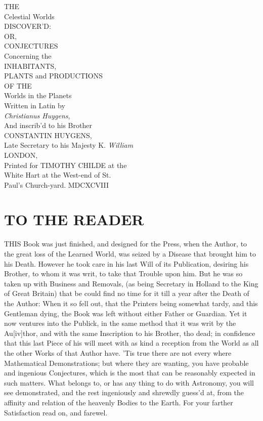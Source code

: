 \documentclass[letterpaper]{book}
\begin{document}
\frontmatter

\thispagestyle{empty}

\begin{titlepage}
	\begin{center}
		\Huge
THE \\
Celestial Worlds \\
DISCOVER'D: \\
OR, \\
CONJECTURES \\
Concerning the \\
INHABITANTS, \\
PLANTS and PRODUCTIONS \\
OF THE \\
Worlds in the Planets \\
\phantom{bla bla}
\phantom{bla bla}
\Large
Written in Latin by \\
\emph{Christianus Huygens}, \\
And inscrib'd to his Brother \\
CONSTANTIN HUYGENS, \\
Late Secretary to his Majesty K. \emph{William} \\
\phantom{bla bla}
\phantom{bla bla}
LONDON, \\
Printed for TIMOTHY CHILDE at the \\
White Hart at the West-end of St. \\
Paul's Church-yard. MDCXCVIII
\end{center}
\end{titlepage}


\chapter{TO THE READER} %
\label{sec:TO THE READER}

THIS Book was just finished, and designed for the Press, when the Author,
to the great loss of the Learned World, was seized by a Disease that brought
him to his Death. However he took care in his last Will of its Publication,
desiring his Brother, to whom it was writ, to take that Trouble upon him.
But he was so taken up with Business and Removals, (as being Secretary in
Holland to the King of Great Britain) that be could find no time for it till
a year after the Death of the Author: When it so fell out, that the Printers
being somewhat tardy, and this Gentleman dying, the Book was left without
either Father or Guardian. Yet it now ventures into the Publick, in the same
method that it was writ by the Au[iv]thor, and with the same Inscription to
his Brother, tho dead; in confidence that this last Piece of his will meet with
as kind a reception from the World as all the other Works of that Author
have. 'Tis true there are not every where Mathematical Demonstrations; but
where they are wanting, you have probable and ingenious Conjectures, which
is the most that can be reasonably expected in such matters. What belongs
to, or has any thing to do with Astronomy, you will see demonstrated, and
the rest ingeniously and shrewdly guess'd at, from the affinity and relation
of the heavenly Bodies to the Earth. For your farther Satisfaction read on,
and farewel.
\end{document}
